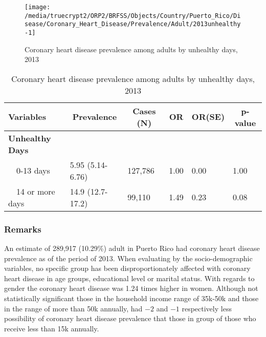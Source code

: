 \begin{figure}[H]
\caption{Coronary heart disease prevalence among adults by unhealthy days, 2013}
\label{fig:unhlthy.Coronary_Heart_Disease.2013}

\begin{knitrout}
\color{fgcolor}

{\centering \texttt{[image: /media/truecrypt2/ORP2/BRFSS/Objects/Country/Puerto\_Rico/Disease/Coronary\_Heart\_Disease/Prevalence/Adult/2013unhealthy-1]} 

}



\end{knitrout}
\end{figure}

\begin{table}[H]
\caption{Coronary heart disease prevalence among adults by unhealthy days, 2013\label{tab:unhlthy.Coronary_Heart_Disease.2013}} 
\begin{center}
\begin{tabular}{llllll}
\hline\hline
\multicolumn{1}{l}{Variables}&\multicolumn{1}{c}{Prevalence}&\multicolumn{1}{c}{Cases (N)}&\multicolumn{1}{c}{OR}&\multicolumn{1}{c}{OR(SE)}&\multicolumn{1}{c}{p-value}\tabularnewline
\hline
{\bfseries Unhealthy Days}&&&&&\tabularnewline
~~0-13 days&5.95 (5.14-6.76)&127,786&1.00&0.00&1.00\tabularnewline
~~14 or more days&14.9 (12.7-17.2)& 99,110&1.49&0.23&0.08\tabularnewline
\hline
\end{tabular}\end{center}

\end{table}


\subsubsection{Remarks}

An estimate of 289,917 
(10.29\%) adult in Puerto Rico had coronary heart disease prevalence as of the period of 2013.
When evaluating by the socio-demographic variables, no specific group has been disproportionately affected with coronary heart disease in age groups, educational level or marital status. With regards to gender the coronary heart disease was 1.24 times higher in women. Although not statistically significant those in the household income range of 35k-50k and those in the range of more than 50k annually, had \ensuremath{-2} and \ensuremath{-1} respectively less possibility of coronary heart disease prevalence that those  in group of those who receive less than 15k annually.

